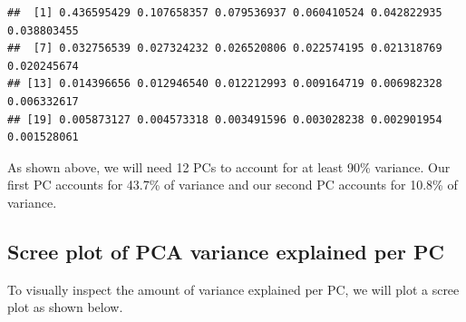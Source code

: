 \documentclass[
]{article}
\newenvironment{Shaded}{\begin{snugshade}}{\end{snugshade}}
\newcommand{\AttributeTok}[1]{\textcolor[rgb]{0.77,0.63,0.00}{#1}}
\newcommand{\CommentTok}[1]{\textcolor[rgb]{0.56,0.35,0.01}{\textit{#1}}}
\newcommand{\DecValTok}[1]{\textcolor[rgb]{0.00,0.00,0.81}{#1}}
\newcommand{\FunctionTok}[1]{\textcolor[rgb]{0.00,0.00,0.00}{#1}}
\newcommand{\NormalTok}[1]{#1}
\newcommand{\SpecialCharTok}[1]{\textcolor[rgb]{0.00,0.00,0.00}{#1}}
\newcommand{\StringTok}[1]{\textcolor[rgb]{0.31,0.60,0.02}{#1}}
\begin{document}
\begin{verbatim}
##  [1] 0.436595429 0.107658357 0.079536937 0.060410524 0.042822935 0.038803455
##  [7] 0.032756539 0.027324232 0.026520806 0.022574195 0.021318769 0.020245674
## [13] 0.014396656 0.012946540 0.012212993 0.009164719 0.006982328 0.006332617
## [19] 0.005873127 0.004573318 0.003491596 0.003028238 0.002901954 0.001528061
\end{verbatim}

As shown above, we will need 12 PCs to account for at least 90\%
variance. Our first PC accounts for 43.7\% of variance and our second PC
accounts for 10.8\% of variance.

\newpage

\hypertarget{scree-plot-of-pca-variance-explained-per-pc}{%
\subsection{Scree plot of PCA variance explained per
PC}\label{scree-plot-of-pca-variance-explained-per-pc}}

To visually inspect the amount of variance explained per PC, we will
plot a scree plot as shown below.

\begin{Shaded}
\end{Shaded}
\end{document}

